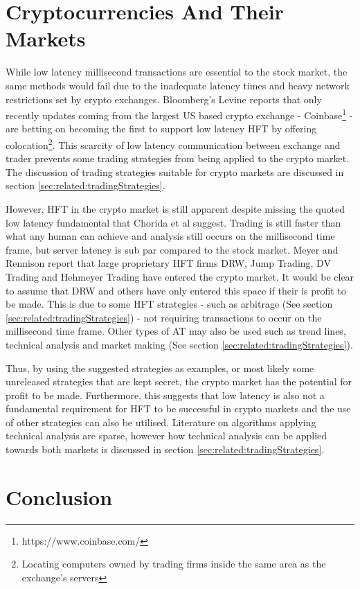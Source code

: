 \section{Cryptocurrencies And Their Markets}
\label{sec:related:cryptoAndTheirMarkets}
While low latency millisecond transactions are essential to the stock market, the same methods would fail due to the inadequate latency times and heavy network restrictions set by crypto exchanges. Bloomberg's Levine reports \cite{WEB:Levine:2018} that only recently updates coming from the largest US based crypto exchange - Coinbase\footnote{https://www.coinbase.com/} - are betting on becoming the first to support low latency HFT by offering colocation\footnote{Locating computers owned by trading firms inside the same area as the exchange's servers}. This scarcity of low latency communication between exchange and trader prevents some trading strategies from being applied to the crypto market. The discussion of trading strategies suitable for crypto markets are discussed in section \ref{sec:related:tradingStrategies}.

However, HFT in the crypto market is still apparent despite missing the quoted low latency fundamental that Chorida et al \cite{REPORT:ChordiaEtAl:2013} suggest. Trading is still faster than what any human can achieve and analysis still occurs on the millisecond time frame, but server latency is sub par compared to the stock market. Meyer and Rennison \cite{ART:Meyer:2017} report that large proprietary HFT firms DRW, Jump Trading, DV Trading and Hehmeyer Trading have entered the crypto market. It would be clear to assume that DRW and others have only entered this space if their is profit to be made. This is due to some HFT strategies - such as arbitrage (See section \ref{sec:related:tradingStrategies}) - not requiring transactions to occur on the millisecond time frame. Other types of AT may also be used such as trend lines, technical analysis and market making (See section \ref{sec:related:tradingStrategies}). 

Thus, by using the suggested strategies as examples, or most likely some unreleased strategies that are kept secret, the crypto market has the potential for profit to be made. Furthermore, this suggests that low latency is also not a fundamental requirement for HFT to be successful in crypto markets and the use of other strategies can also be utilised. Literature on algorithms applying technical analysis are sparse, however how technical analysis can be applied towards both markets is discussed in section \ref{sec:related:tradingStrategies}.

\section{Conclusion}
\label{sec:related:conclusion}

